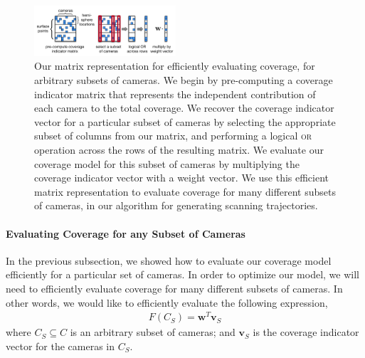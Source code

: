 \begin{figure}[t]
\begin{center}
\includegraphics[width=0.47\textwidth]{images/2017_iccv_supplementary/coverage_matrix.pdf}{\vspace{-7pt}}
\end{center}
\caption{
Our matrix representation for efficiently evaluating coverage, for arbitrary subsets of cameras.
We begin by pre-computing a coverage indicator matrix that represents the independent contribution of each camera to the total coverage.
We recover the coverage indicator vector  for a particular subset of cameras by selecting the appropriate subset of columns from our matrix, and performing a logical \textsc{or} operation across the rows of the resulting matrix.
We evaluate our coverage model for this subset of cameras by multiplying the coverage indicator vector with a weight vector.
We use this efficient matrix representation to evaluate coverage for many different subsets of cameras, in our algorithm for generating scanning trajectories.
\vspace{-5pt}
}
\label{fig:coverage_matrix}
\end{figure}

\vspace{-12pt}
\paragraph{Evaluating Coverage for any Subset of Cameras}
In the previous subsection, we showed how to evaluate our coverage model efficiently for a particular set of cameras.
In order to optimize our model, we will need to efficiently evaluate coverage for many different subsets of cameras.
In other words, we would like to efficiently evaluate the following expression, 
%
\begin{equation}
\begin{aligned}
F(C_S) = \mathbf{w}^T \mathbf{v}_S
\end{aligned}
\end{equation}
%
where $C_S \subseteq C$ is an arbitrary subset of cameras;
and $\mathbf{v}_S$ is the coverage indicator vector for the cameras in $C_S$. 

